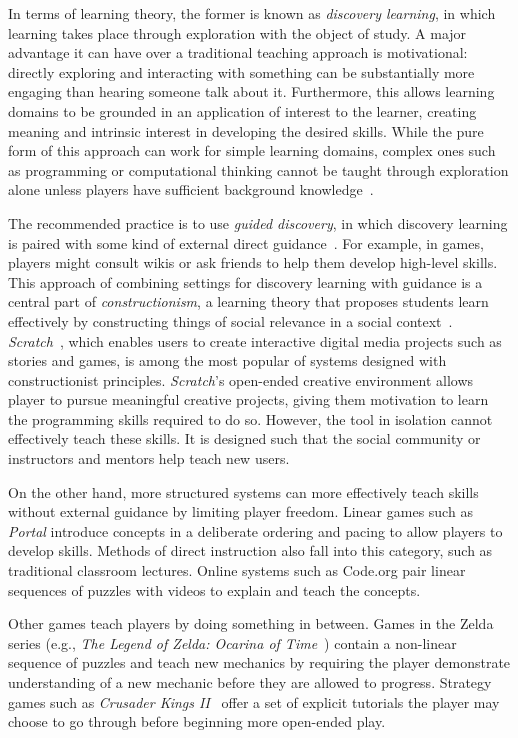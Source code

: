 \documentclass{sig-alternate}
\begin{document}
In terms of learning theory, the former is known as \emph{discovery learning}, in which learning takes place through exploration with the object of study.
A major advantage it can have over a traditional teaching approach is motivational: directly exploring and interacting with something can be substantially more engaging than hearing someone talk about it.
Furthermore, this allows learning domains to be grounded in an application of interest to the learner, creating meaning and intrinsic interest in developing the desired skills.
While the pure form of this approach can work for simple learning domains, complex ones such as programming or computational thinking cannot be taught through exploration alone unless players have sufficient background knowledge~\cite{kirschner2006minimal}. 

The recommended practice is to use \emph{guided discovery}, in which discovery learning is paired with some kind of external direct guidance~\cite{mayer2004should}.  For example, in games, players might consult wikis or ask friends to help them develop high-level skills.
This approach of combining settings for discovery learning with guidance is a central part of \emph{constructionism}, a learning theory that proposes students learn effectively by constructing things of social relevance in a social context~\cite{kafai06constructionism}.
\emph{Scratch}~\cite{maloney2010scratch}, which enables users to create interactive digital media projects such as stories and games, is among the most popular of systems designed with constructionist principles.
\emph{Scratch}'s open-ended creative environment allows player to pursue meaningful creative projects, giving them motivation to learn the programming skills required to do so.
However, the tool in isolation cannot effectively teach these skills.
It is designed such that the social community or instructors and mentors help teach new users.

On the other hand, more structured systems can more effectively teach skills without external guidance by limiting player freedom.
Linear games such as \emph{Portal} introduce concepts in a deliberate ordering and pacing to allow players to develop skills.
Methods of direct instruction also fall into this category, such as traditional classroom lectures.
Online systems such as Code.org pair linear sequences of puzzles with videos to explain and teach the concepts.

Other games teach players by doing something in between. 
Games in the Zelda series (e.g., \emph{The Legend of Zelda: Ocarina of Time}~\cite{zelda_oot}) contain a non-linear sequence of puzzles and teach new mechanics by requiring the player demonstrate understanding of a new mechanic before they are allowed to progress. 
Strategy games such as \emph{Crusader Kings II}~\cite{ck2} offer a set of explicit tutorials the player may choose to go through before beginning more open-ended play.
\end{document}
